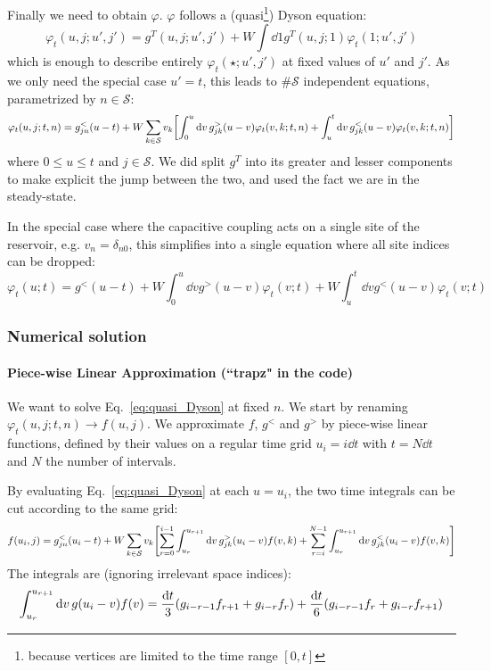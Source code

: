 \documentclass[12pt]{article}
\begin{document}
Finally we need to obtain $\varphi$. 
$\varphi$ follows a (quasi\footnote{because vertices are limited to the time range $[0, t]$}) Dyson equation:
\begin{equation}
	\varphi_t(u, j; u', j') = g^T(u, j; u', j') + W \int \dd{1} g^T(u, j; 1) \varphi_t(1; u', j')
\end{equation}
which is enough to describe entirely $\varphi_t(\star; u', j')$ at fixed values of $u'$ and $j'$. As we only need the special case $u' = t$, this leads to $\# \mathcal{S}$ independent equations, parametrized by $n \in \mathcal{S}$:
\begin{equation}
	\label{eq:quasi_Dyson}
	\varphi_t(u, j; t, n) = g_{jn}^<(u - t) + W \sum_{k \in \mathcal{S}} v_k \qty[ \int_0^u \dd{v} g_{jk}^>(u - v) \varphi_t(v, k; t, n) + \int_u^t \dd{v} g_{jk}^<(u - v) \varphi_t(v, k; t, n) ]
\end{equation}
where $0 \le u \le t$ and $j \in \mathcal{S}$.
We did split $g^T$ into its greater and lesser components to make explicit the jump between the two, and used the fact we are in the steady-state.

In the special case where the capacitive coupling acts on a single site of the reservoir, e.g. $v_n = \delta_{n0}$, this simplifies into a single equation where all site indices can be dropped:
\begin{equation}
	\label{eq:quasi_Dyson_single_site}
	\varphi_t(u; t) = g^<(u - t) + W \int_0^u \dd{v} g^>(u - v) \varphi_t(v; t) + W \int_u^t \dd{v} g^<(u - v) \varphi_t(v; t)
\end{equation}


\subsubsection{Numerical solution}

\paragraph{Piece-wise Linear Approximation (``trapz" in the code)}

We want to solve Eq.~\eqref{eq:quasi_Dyson} at fixed $n$. We start by renaming $\varphi_t(u, j; t, n) \rightarrow f(u, j)$.
We approximate $f$, $g^<$ and $g^>$ by piece-wise linear functions, defined by their values on a regular time grid $u_i = i \dd{t}$ with $t = N \dd{t}$ and $N$ the number of intervals.

By evaluating Eq.~\eqref{eq:quasi_Dyson} at each $u=u_i$, the two time integrals can be cut according to the same grid:
\begin{equation}
	f(u_i, j) = g_{jn}^<(u_i - t) + W \sum_{k \in \mathcal{S}} v_k \qty[ \sum_{r=0}^{i-1}\int_{u_r}^{u_{r+1}} \dd{v} g_{jk}^>(u_i - v) f(v, k) + \sum_{r=i}^{N-1} \int_{u_r}^{u_{r+1}} \dd{v} g_{jk}^<(u_i - v) f(v, k) ]
\end{equation}
The integrals are (ignoring irrelevant space indices):
\begin{equation}
	\int_{u_r}^{u_{r+1}} \dd{v} g(u_i - v) f(v) =
	\frac{\dd{t}}{3} \qty(g_{i - r - 1} f_{r+1} + g_{i-r} f_r) +
	\frac{\dd{t}}{6} \qty(g_{i-r-1} f_r + g_{i-r} f_{r+1})
\end{equation}
\end{document}
